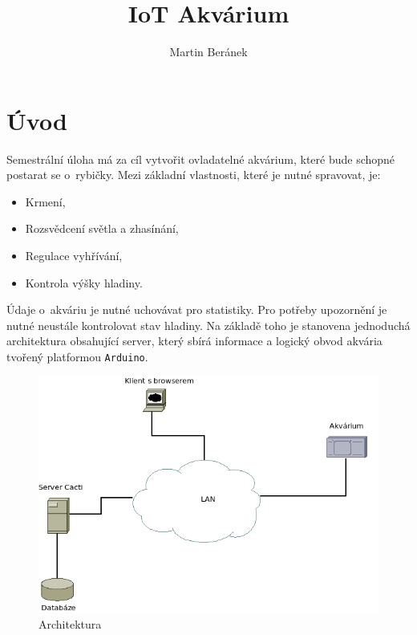 \documentclass[a4paper,10pt]{article}
\begin{document}
\title{IoT Akvárium}
\author{Martin Beránek}
\maketitle

\newpage

\tableofcontents
\listoffigures

\newpage

\section{Úvod}

Semestrální úloha má za cíl vytvořit ovladatelné akvárium, které bude schopné postarat se o~rybičky. Mezi základní vlastnosti\label{vlastn}, které je nutné spravovat, je:

\begin{itemize}
	\item Krmení,
	\item Rozsvědcení světla a zhasínání,
	\item Regulace vyhřívání,
	\item Kontrola výšky hladiny.
\end{itemize}

Údaje o~akváriu je nutné uchovávat pro statistiky. Pro potřeby upozornění je nutné neustále kontrolovat stav hladiny. Na základě toho je stanovena jednoduchá architektura obsahující server, který sbírá informace a logický obvod akvária tvořený platformou \texttt{Arduino}.

\begin{figure}[H]
  \centering
    \includegraphics[width=1\textwidth]{net.png}
  \caption{Architektura}
  \label{char:arch}
\end{figure}
\end{document}
